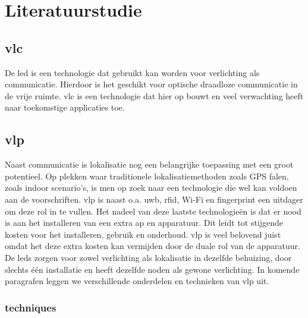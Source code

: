 \chapter{Literatuurstudie}
\section{\acrfull{vlc}}
	De \acrfull{led} is een technologie dat gebruikt kan worden voor verlichting als communicatie. Hierdoor is het geschikt voor optische draadloze communicatie in de vrije ruimte. \gls{vlc} is een technologie dat hier op bouwt en veel verwachting heeft naar toekomstige applicaties toe. 
\section{\acrfull{vlp}}
	Naast communicatie is lokalisatie nog een belangrijke toepassing met een groot potentieel. Op plekken waar traditionele lokalisatiemethoden zoals GPS falen, zoals indoor scenario's, is men op zoek naar een technologie die wel kan voldoen aan de voorschriften. \acrfull{vlp} is naast o.a. \acrfull{uwb}, \acrfull{rfid}, Wi-Fi en fingerprint een uitdager om deze rol in te vullen. Het nadeel van deze laatste technologie\"en is dat er nood is aan het installeren van een extra \acrfull{ap} en apparatuur. Dit leidt tot stijgende kosten voor het installeren, gebruik en onderhoud.
	\gls{vlp} is veel belovend juist omdat het deze extra kosten kan vermijden door de duale rol van de apparatuur. De \glspl{led} zorgen voor zowel verlichting als lokalisatie in dezelfde behuizing, door slechts één installatie en heeft dezelfde noden als gewone verlichting. In komende paragrafen leggen we verschillende onderdelen en technieken van \gls{vlp} uit.
	\subsection{techniques}
